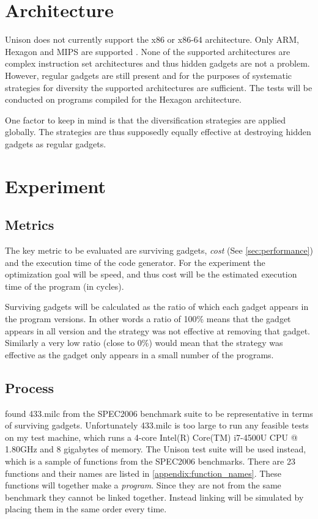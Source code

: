 \section{Architecture}
\label{sec:arch}

Unison does not currently support the x86 or x86-64 architecture. Only ARM, Hexagon and MIPS
are supported \cite{unison-src}. None of the supported architectures are complex instruction
set architectures and thus hidden gadgets are not a problem. However, regular gadgets are
still present and for the purposes of systematic strategies for diversity the supported
architectures are sufficient. The tests will be conducted on programs compiled for the
Hexagon architecture.

One factor to keep in mind is that the diversification strategies are applied globally.
The strategies are thus supposedly equally effective at destroying hidden gadgets as
regular gadgets.

\section{Experiment}

\subsection{Metrics}

The key metric to be evaluated are surviving gadgets, \textit{cost} (See
\ref{sec:performance}) and the execution time of the code generator. For the experiment
the optimization goal will be speed, and thus cost will be the estimated execution time of
the program (in cycles).

Surviving gadgets will be calculated as the ratio of which each gadget appears in the program
versions. In other words a ratio of 100\% means that the gadget appears in all version
and the strategy was not effective at removing that gadget. Similarly a very low ratio
(close to 0\%) would mean that the strategy was effective as the gadget only appears in
a small number of the programs.

\subsection{Process}

\textcite{large-scale-automated} found 433.milc from the SPEC2006 benchmark suite to be
representative in terms of surviving gadgets. Unfortunately 433.milc is too large to run
any feasible tests on my test machine, which runs a 4-core Intel(R) Core(TM) i7-4500U CPU
@ 1.80GHz and 8 gigabytes of memory. The Unison test suite will be used instead, which is
a sample of functions from the SPEC2006 benchmarks. There are 23 functions and their names
are listed in \ref{appendix:function_names}. These functions will together make a
\textit{program}. Since they are not from the same benchmark they cannot be linked
together. Instead linking will be simulated by placing them in the same order every time.

